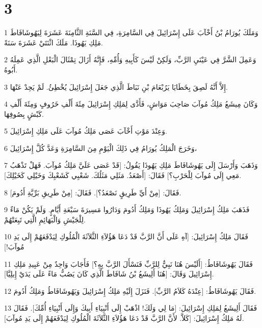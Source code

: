 \chapter{3}

\par 1 وَمَلَكَ يُورَامُ بْنُ أَخْآبَ عَلَى إِسْرَائِيلَ فِي السَّامِرَةِ، فِي السَّنَةِ الثَّامِنَةَ عَشَرَةَ لِيَهُوشَافَاطَ مَلِكِ يَهُوذَا. مَلَكَ اثْنَتَيْ عَشَرَةَ سَنَةً.
\par 2 وَعَمِلَ الشَّرَّ فِي عَيْنَيِ الرَّبِّ، وَلَكِنْ لَيْسَ كَأَبِيهِ وَأُمِّهِ، فَإِنَّهُ أَزَالَ تِمْثَالَ الْبَعْلِ الَّذِي عَمِلَهُ أَبُوهُ.
\par 3 إِلاَّ أَنَّهُ لَصِقَ بِخَطَايَا يَرُبْعَامَ بْنِ نَبَاطَ الَّذِي جَعَلَ إِسْرَائِيلَ يُخْطِئُ. لَمْ يَحِدْ عَنْهَا.
\par 4 وَكَانَ مِيشَعُ مَلِكُ مُوآبَ صَاحِبَ مَوَاشٍ، فَأَدَّى لِمَلِكِ إِسْرَائِيلَ مِئَةَ أَلْفِ خَرُوفٍ وَمِئَةَ أَلْفِ كَبْشٍ بِصُوفِهَا.
\par 5 وَعِنْدَ مَوْتِ أَخْآبَ عَصَى مَلِكُ مُوآبَ عَلَى مَلِكِ إِسْرَائِيلَ.
\par 6 وَخَرَجَ الْمَلِكُ يُورَامُ فِي ذَلِكَ الْيَوْمِ مِنَ السَّامِرَةِ وَعَدَّ كُلَّ إِسْرَائِيلَ،
\par 7 وَذَهَبَ وَأَرْسَلَ إِلَى يَهُوشَافَاطَ مَلِكِ يَهُوذَا يَقُولُ: [قَدْ عَصَى عَلَيَّ مَلِكُ مُوآبَ. فَهَلْ تَذْهَبُ مَعِي إِلَى مُوآبَ لِلْحَرْبِ؟] فَقَالَ: [أَصْعَدُ. مَثَلِي مَثَلُكَ. شَعْبِي كَشَعْبِكَ وَخَيْلِي كَخَيْلِكَ].
\par 8 فَقَالَ: [مِنْ أَيِّ طَرِيقٍ نَصْعَدُ؟]. فَقَالَ: [مِنْ طَرِيقِ بَرِّيَّةِ أَدُومَ].
\par 9 فَذَهَبَ مَلِكُ إِسْرَائِيلَ وَمَلِكُ يَهُوذَا وَمَلِكُ أَدُومَ وَدَارُوا مَسِيرَةَ سَبْعَةِ أَيَّامٍ. وَلَمْ يَكُنْ مَاءٌ لِلْجَيْشِ وَالْبَهَائِمِ الَّتِي تَبِعَتْهُمْ.
\par 10 فَقَالَ مَلِكُ إِسْرَائِيلَ: [آهِ عَلَى أَنَّ الرَّبَّ قَدْ دَعَا هَؤُلاَءِ الثَّلاَثَةَ الْمُلُوكِ لِيَدْفَعَهُمْ إِلَى يَدِ مُوآبَ!]
\par 11 فَقَالَ يَهُوشَافَاطُ: [أَلَيْسَ هُنَا نَبِيٌّ لِلرَّبِّ فَنَسْأَلَ الرَّبَّ بِهِ؟] فَأَجَابَ وَاحِدٌ مِنْ عَبِيدِ مَلِكِ إِسْرَائِيلَ وَقَالَ: [هُنَا أَلِيشَعُ بْنُ شَافَاطَ الَّذِي كَانَ يَصُبُّ مَاءً عَلَى يَدَيْ إِيلِيَّا].
\par 12 فَقَالَ يَهُوشَافَاطُ: [عِنْدَهُ كَلاَمُ الرَّبِّ]. فَنَزَلَ إِلَيْهِ مَلِكُ إِسْرَائِيلَ وَيَهُوشَافَاطُ وَمَلِكُ أَدُومَ.
\par 13 فَقَالَ أَلِيشَعُ لِمَلِكِ إِسْرَائِيلَ: [مَا لِي وَلَكَ! اذْهَبْ إِلَى أَنْبِيَاءِ أَبِيكَ وَإِلَى أَنْبِيَاءِ أُمِّكَ]. فَقَالَ لَهُ مَلِكُ إِسْرَائِيلَ: [كَلاَّ. لأَنَّ الرَّبَّ قَدْ دَعَا هَؤُلاَءِ الثَّلاَثَةَ الْمُلُوكِ لِيَدْفَعَهُمْ إِلَى يَدِ مُوآبَ].

